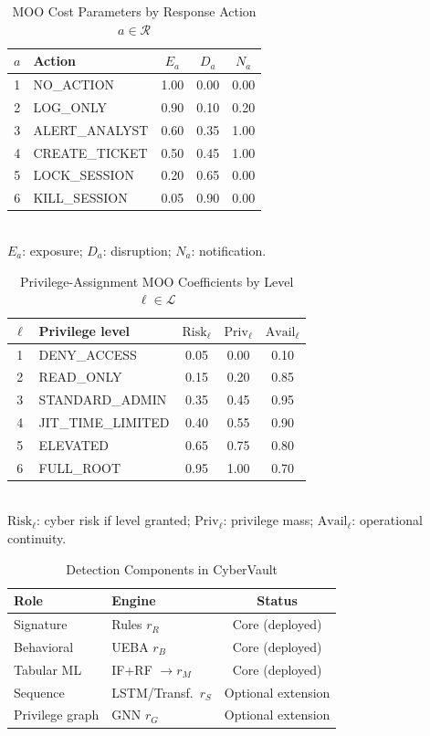 \documentclass{ieeeaccess}
\begin{document}
\begin{table}[!t]
\caption{MOO Cost Parameters by Response Action $a\in\mathcal{R}$}
\label{tab:moo-costs}
\centering
\scriptsize
\begin{tabular}{@{}clccc@{}}
\toprule
$a$ & \textbf{Action} & $E_a$ & $D_a$ & $N_a$ \\
\midrule
1 & NO\_ACTION & 1.00 & 0.00 & 0.00 \\
2 & LOG\_ONLY & 0.90 & 0.10 & 0.20 \\
3 & ALERT\_ANALYST & 0.60 & 0.35 & 1.00 \\
4 & CREATE\_TICKET & 0.50 & 0.45 & 1.00 \\
5 & LOCK\_SESSION & 0.20 & 0.65 & 0.00 \\
6 & KILL\_SESSION & 0.05 & 0.90 & 0.00 \\
\bottomrule
\end{tabular}
\\[0.35em]
{\scriptsize $E_a$: exposure; $D_a$: disruption; $N_a$: notification.}
\end{table}

\begin{table}[!t]
\caption{Privilege-Assignment MOO Coefficients by Level $\ell\in\mathcal{L}$}
\label{tab:priv-moo}
\centering
\scriptsize
\begin{tabular}{@{}clccc@{}}
\toprule
$\ell$ & \textbf{Privilege level} & $\mathrm{Risk}_{\ell}$ & $\mathrm{Priv}_{\ell}$ & $\mathrm{Avail}_{\ell}$ \\
\midrule
1 & DENY\_ACCESS & 0.05 & 0.00 & 0.10 \\
2 & READ\_ONLY & 0.15 & 0.20 & 0.85 \\
3 & STANDARD\_ADMIN & 0.35 & 0.45 & 0.95 \\
4 & JIT\_TIME\_LIMITED & 0.40 & 0.55 & 0.90 \\
5 & ELEVATED & 0.65 & 0.75 & 0.80 \\
6 & FULL\_ROOT & 0.95 & 1.00 & 0.70 \\
\bottomrule
\end{tabular}
\\[0.35em]
{\scriptsize $\mathrm{Risk}_{\ell}$: cyber risk if level granted; $\mathrm{Priv}_{\ell}$: privilege mass; $\mathrm{Avail}_{\ell}$: operational continuity.}
\end{table}

\begin{table}[!t]
\caption{Detection Components in CyberVault}
\label{tab:deployed-scope}
\centering
\scriptsize
\begin{tabular}{@{}ll c@{}}
\toprule
\textbf{Role} & \textbf{Engine} & \textbf{Status} \\
\midrule
Signature & Rules $r_R$ & Core (deployed) \\
Behavioral & UEBA $r_B$ & Core (deployed) \\
Tabular ML & IF+RF $\rightarrow r_M$ & Core (deployed) \\
Sequence & LSTM/Transf.\ $r_S$ & Optional extension \\
Privilege graph & GNN $r_G$ & Optional extension \\
\bottomrule
\end{tabular}
\end{table}
\end{document}
